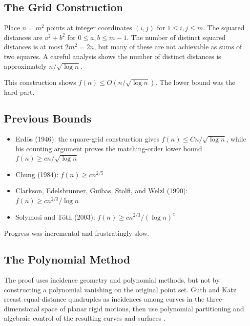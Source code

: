\subsection{The Grid Construction}

\begin{definition}
Place $n = m^2$ points at integer coordinates $(i,j)$ for $1 \leq i,j \leq m$. The squared distances are $a^2 + b^2$ for $0 \leq a,b \leq m-1$. The number of distinct squared distances is at most $2m^2 = 2n$, but many of these are not achievable as sums of two squares. A careful analysis shows the number of distinct distances is approximately $n/\sqrt{\log n}$.
\end{definition}

This construction shows $f(n) \leq O(n/\sqrt{\log n})$. The lower bound was the hard part.

\subsection{Previous Bounds}

\begin{itemize}
\item Erd\H{o}s (1946): the square-grid construction gives $f(n) \leq Cn/\sqrt{\log n}$, while his counting argument proves the matching-order lower bound $f(n) \geq cn/\sqrt{\log n}$ \cite{erdos1946}
\item Chung (1984): $f(n) \geq cn^{2/5}$ \cite{chung1984}
\item Clarkson, Edelsbrunner, Guibas, Stolfi, and Welzl (1990): $f(n) \geq cn^{2/3}/\log n$ \cite{clarkson1990}
\item Solymosi and T\'oth (2003): $f(n) \geq cn^{2/3}/(\log n)^{c}$ \cite{solymosi2003}
\end{itemize}

Progress was incremental and frustratingly slow.

\subsection{The Polynomial Method}

The proof uses incidence geometry and polynomial methods, but not by constructing a polynomial vanishing on the original point set. Guth and Katz recast equal-distance quadruples as incidences among curves in the three-dimensional space of planar rigid motions, then use polynomial partitioning and algebraic control of the resulting curves and surfaces \cite{guth2015}.


